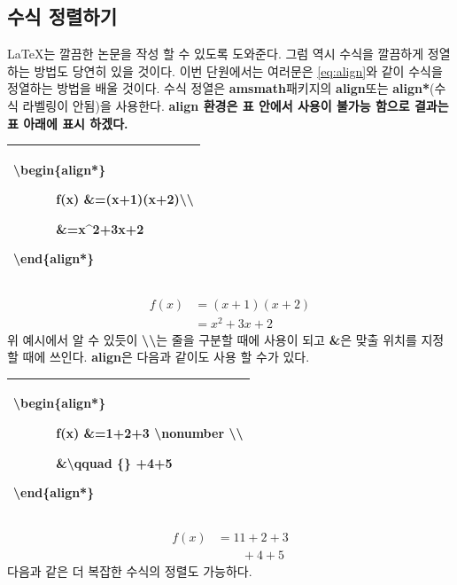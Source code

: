 \documentclass[12pt]{article}
\begin{document}
	\subsection{수식 정렬하기}
	\LaTeX 는 깔끔한 논문을 작성 할 수 있도록 도와준다. 그럼 역시 수식을 깔끔하게 정열하는 방법도 당연히 있을 것이다. 이번 단원에서는 여러문은 \eqref{eq:align}와 같이 수식을 정열하는 방법을 배울 것이다.\newline
	수식 정열은 \textbf{amsmath}패키지의 \textbf{align}또는 \textbf{align*}(수식 라벨링이 안됨)을 사용한다.\newline
	\textbf{align 환경은 표 안에서 사용이 불가능 함으로 결과는 표 아래에 표시 하겠다.}\newline
	
	\begin{tabularx}{\textwidth\onehalfspacing}{|X|}
		\hline
		\textbackslash begin\{align*\}
		
		\ \ \ \ \ \ f(x) \&=(x+1)(x+2)\textbackslash\textbackslash
		
		\ \ \ \ \ \ \&=x\textasciicircum2+3x+2
		
		\textbackslash end\{align*\}
		\\\hline
	\end{tabularx}
	\begin{align*}
	f(x) &=(x+1)(x+2)\\
	&=x^2+3x+2
	\end{align*}
	위 예시에서 알 수 있듯이 \textbf{\textbackslash\textbackslash}는 줄을 구분할 때에 사용이 되고 \textbf{\&}은 맞출 위치를 지정 할 때에 쓰인다.
	\newline\newline
	\textbf{align}은 다음과 같이도 사용 할 수가 있다.\newline
	
	\begin{tabularx}{\textwidth\onehalfspacing}{|X|}
		\hline
		\textbackslash begin\{align*\}
		
		\ \ \ \ \ \ f(x) \&=1+2+3 \textbackslash nonumber \textbackslash\textbackslash
		
		\ \ \ \ \ \ \&\textbackslash qquad \{\} +4+5
		
		\textbackslash end\{align*\}\\
		\hline
	\end{tabularx}
	\begin{align*}
		f(x) &=11+2+3\nonumber\\
		& \qquad{}+4+5
	\end{align*}\clearpage
	다음과 같은 더 복잡한 수식의 정렬도 가능하다.\newline
	
\end{document}
